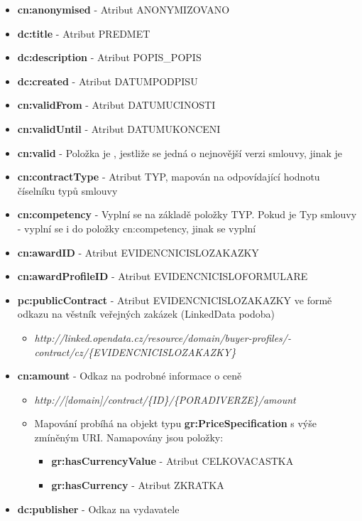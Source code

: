 \begin{itemize}
\item \textbf{cn:anonymised} - Atribut ANONYMIZOVANO
\item \textbf{dc:title} - Atribut PREDMET
\item \textbf{dc:description} - Atribut POPIS\_POPIS
\item \textbf{dc:created} - Atribut DATUMPODPISU
\item \textbf{cn:validFrom} - Atribut DATUMUCINOSTI
\item \textbf{cn:validUntil} - Atribut DATUMUKONCENI
\item \textbf{cn:valid} - Položka je , jestliže se jedná o nejnovější verzi smlouvy, jinak je 
\item \textbf{cn:contractType} - Atribut TYP, mapován na odpovídající hodnotu číselníku typů smlouvy
\item \textbf{cn:competency} - Vyplní se na základě položky TYP. Pokud je Typ smlouvy -  vyplní se i do položky cn:competency, jinak se vyplní 
\item \textbf{cn:awardID} - Atribut EVIDENCNICISLOZAKAZKY
\item \textbf{cn:awardProfileID} - Atribut EVIDENCNICISLOFORMULARE
\item \textbf{pc:publicContract} - Atribut EVIDENCNICISLOZAKAZKY ve formě odkazu na věstník veřejných zakázek (LinkedData podoba)
	\begin{itemize}
	\item \textit{http://linked.opendata.cz/resource/domain/buyer-profiles/-\\contract/cz/\{EVIDENCNICISLOZAKAZKY\}}
	\end{itemize}
\item \textbf{cn:amount} - Odkaz na podrobné informace o ceně
	\begin{itemize}
	\item \textit{http://[domain]/contract/\{ID\}/\{PORADIVERZE\}/amount}	
	\item Mapování probíhá na objekt typu \textbf{gr:PriceSpecification} s výše zmíněným URI. Namapovány jsou položky:
		\begin{itemize}
		\item \textbf{gr:hasCurrencyValue} - Atribut CELKOVACASTKA
		\item \textbf{gr:hasCurrency} - Atribut ZKRATKA
		\end{itemize}
	\end{itemize}
\item \textbf{dc:publisher} - Odkaz na vydavatele

\end{itemize}
